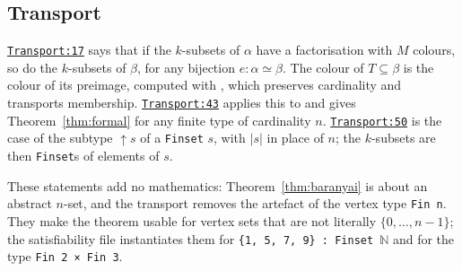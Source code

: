 \documentclass[11pt]{article}
\theoremstyle{definition}
\theoremstyle{remark}
\newcommand{\lean}[1]{\texttt{#1}}
\newcommand{\repo}{https://github.com/jpbald93/baranyai}
\newcommand{\commit}{051ae8c4063be0bb70f1726e9f60d0319dd37d91}
\newcommand{\src}[2]{\href{\repo/blob/\commit/Baranyai/#1.lean\#L#2}{\texttt{#1:#2}}}
\newcommand{\NN}{\mathbb{N}}
\begin{document}
\subsection{Transport}\label{sec:transport}
 \src{Transport}{17} says that if the $k$-subsets of $\alpha$ have
a factorisation with $M$ colours, so do the $k$-subsets of $\beta$, for any bijection
$e:\alpha\simeq\beta$. The colour of $T\subseteq\beta$ is the colour of its preimage, computed with
, which preserves cardinality and transports membership.
 \src{Transport}{43} applies this to
 and gives Theorem~\ref{thm:formal} for any finite type of
cardinality $n$.  \src{Transport}{50} is the case of the subtype
$\uparrow s$ of a \lean{Finset} $s$, with $|s|$ in place of $n$; the $k$-subsets are then
\lean{Finset}s of elements of $s$.

These statements add no mathematics: Theorem~\ref{thm:baranyai} is about an abstract $n$-set, and
the transport removes the artefact of the vertex type \lean{Fin n}. They make the theorem usable
for vertex sets that are not literally $\{0,\dots,n-1\}$; the satisfiability file instantiates them
for \lean{\{1, 5, 7, 9\} : Finset}~$\NN$ and for the type \lean{Fin 2 × Fin 3}.
\end{document}
